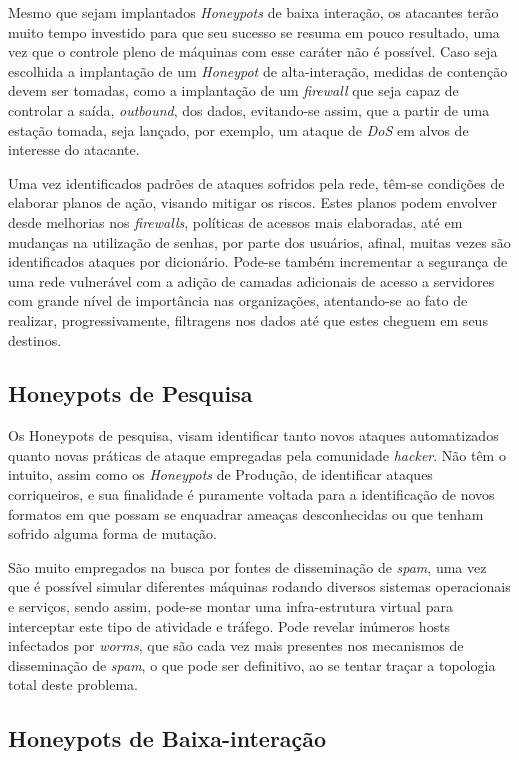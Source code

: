 Mesmo que sejam implantados \textit{Honeypots} de baixa interação, os atacantes terão muito tempo investido para que seu sucesso se resuma em pouco resultado, uma vez que o controle pleno de máquinas com esse caráter não é possível. Caso seja escolhida a implantação de um \textit{Honeypot} de alta-interação, medidas de contenção devem ser tomadas, como a implantação de um \textit{firewall} que seja capaz de controlar a saída, \textit{outbound}, dos dados, evitando-se assim, que a partir de uma estação tomada, seja lançado, por exemplo, um ataque de \textit{DoS} em alvos de interesse do atacante.

Uma vez identificados padrões de ataques sofridos pela rede, têm-se condições de elaborar planos de ação, visando mitigar os riscos. Estes planos podem envolver desde melhorias nos \textit{firewalls}, políticas de acessos mais elaboradas, até em mudanças na utilização de senhas, por parte dos usuários, afinal, muitas vezes são identificados ataques por dicionário. Pode-se também incrementar a segurança de uma rede vulnerável com a adição de camadas adicionais de acesso a servidores com grande nível de importância nas organizações, atentando-se ao fato de realizar, progressivamente, filtragens nos dados até que estes cheguem em seus destinos.


\subsection{Honeypots de Pesquisa}

Os Honeypots de pesquisa, visam identificar tanto novos ataques automatizados quanto novas práticas de ataque empregadas pela comunidade \textit{hacker}. Não têm o intuito, assim como os \textit{Honeypots} de Produção, de identificar ataques corriqueiros, e sua finalidade é puramente voltada para a identificação de novos formatos em que possam se enquadrar ameaças desconhecidas ou que tenham sofrido alguma forma de mutação.

São muito empregados na busca por fontes de disseminação de \textit{spam}, uma vez que é possível simular diferentes máquinas rodando diversos sistemas operacionais e serviços, sendo assim, pode-se montar uma infra-estrutura virtual para interceptar este tipo de atividade e tráfego. Pode revelar inúmeros hosts infectados por \textit{worms}, que são cada vez mais presentes nos mecanismos de disseminação de \textit{spam}, o que pode ser definitivo, ao se tentar traçar a topologia total deste problema.

\subsection{Honeypots de Baixa-interação}

